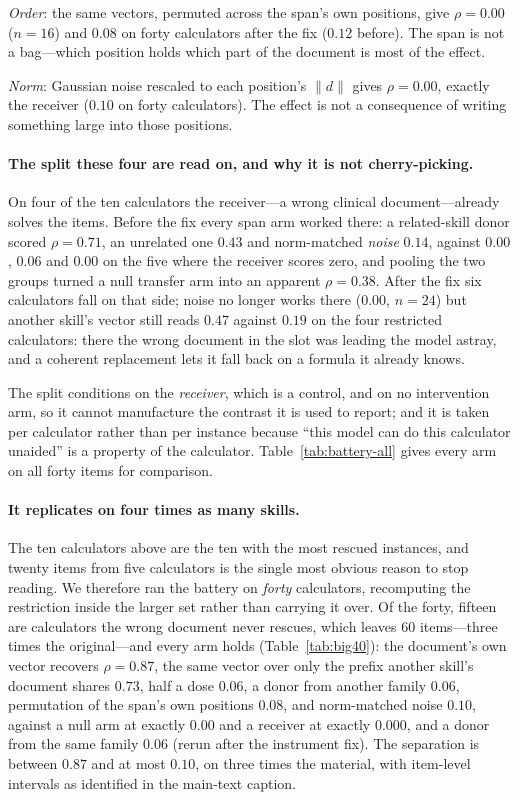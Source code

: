\documentclass{article}
\newcommand{\dvec}{\ensuremath{d}}
\begin{document}
\emph{Order}: the same vectors, permuted across the span's own positions, give
$\rho = 0.00$ ($n=16$) and $0.08$ on forty calculators after the fix ($0.12$
before). The span is not a bag---which position holds which part of the
document is most of the effect.

\emph{Norm}: Gaussian noise rescaled to each position's $\|\dvec\|$ gives
$\rho = 0.00$, exactly the receiver ($0.10$ on forty calculators). The effect is not a consequence of writing
something large into those positions.

\paragraph{The split these four are read on, and why it is not cherry-picking.}
On four of the ten calculators the receiver---a wrong clinical document---already
solves the items. Before the fix every span arm worked there: a related-skill
donor scored $\rho = 0.71$, an unrelated one $0.43$ and norm-matched
\emph{noise} $0.14$, against $0.00$, $0.06$ and $0.00$ on the five where the
receiver scores zero, and pooling the two groups turned a null transfer arm into
an apparent $\rho = 0.38$. After the fix six calculators fall on that side;
noise no longer works there ($0.00$, $n=24$) but another skill's vector still
reads $0.47$ against $0.19$ on the four restricted calculators: there the wrong
document in the slot was leading the model astray, and a coherent replacement
lets it fall back on a formula it already knows.

The split conditions on the \emph{receiver}, which is a control, and on no
intervention arm, so it cannot manufacture the contrast it is used to report; and
it is taken per calculator rather than per instance because ``this model can do
this calculator unaided'' is a property of the calculator. Table~\ref{tab:battery-all}
gives every arm on all forty items for comparison.

\paragraph{It replicates on four times as many skills.} The ten calculators
above are the ten with the most rescued instances, and twenty items from five
calculators is the single most obvious reason to stop reading. We therefore ran
the battery on \emph{forty} calculators, recomputing the restriction inside the
larger set rather than carrying it over. Of the forty, fifteen are calculators
the wrong document never rescues, which leaves $60$ items---three times the
original---and every arm holds (Table~\ref{tab:big40}): the document's own
vector recovers $\rho = 0.87$, the same vector over only the prefix another skill's document shares $0.73$, half a dose
$0.06$, a donor from another family $0.06$, permutation of the span's own
positions $0.08$, and norm-matched noise $0.10$, against a null arm at exactly
$0.00$ and a receiver at exactly $0.000$, and a donor from the same family
$0.06$ (rerun after the instrument fix). The separation is
between $0.87$ and at most $0.10$, on three times the material, with
item-level intervals as identified in the main-text caption.
\end{document}
